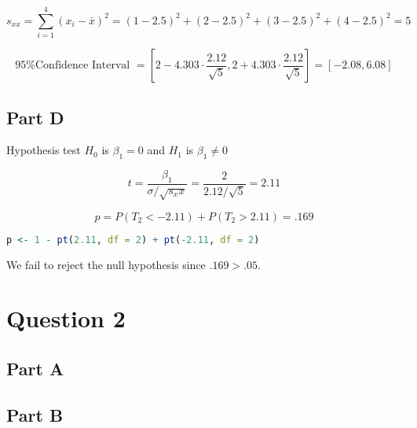 \documentclass[letterpaper]{article}
\begin{document}
$$s_{xx} = \sum_{i=1}^4 (x_i - \bar{x})^2 = (1 - 2.5)^2 + (2 - 2.5)^2 + (3 - 2.5)^2 + (4 - 2.5)^2 = 5$$

$$\text{95\% Confidence Interval } = [2 - 4.303 \cdot \frac{2.12}{\sqrt{5}}, 2 + 4.303 \cdot \frac{2.12}{\sqrt{5}}] = [-2.08, 6.08]$$

\subsection*{Part D}

Hypothesis test $H_0$ is $\beta_1 = 0$ and $H_1$ is $\beta_1 \neq 0$

$$t = \frac{\beta_1}{\sigma / \sqrt{s_xx}} = \frac{2}{2.12 / \sqrt{5}} = 2.11$$

$$p = P(T_2 < -2.11) + P(T_2 > 2.11) = .169$$

\begin{lstlisting}[language=R]
    p <- 1 - pt(2.11, df = 2) + pt(-2.11, df = 2)
\end{lstlisting}

\noindent We fail to reject the null hypothesis since $.169 > .05$.

\newpage

\section*{Question 2}

\subsection*{Part A}

\subsection*{Part B}
\end{document}
